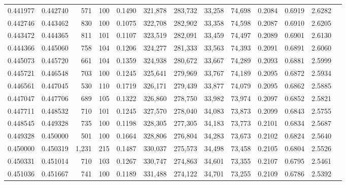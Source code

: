 \begin{tabular}{rrrrrrrrrrrrr}
0.441977 & 0.442740 &    571 &   100 &                                     0.1490 & 321,878 & 283,732 &  33,258 &  74,698 & 0.2084 & 0.6919 & 2.6282 \\
0.442746 & 0.443462 &    830 &   100 &                                     0.1075 & 322,708 & 282,902 &  33,358 &  74,598 & 0.2087 & 0.6910 & 2.6205 \\
0.443472 & 0.444365 &    811 &   101 &                                     0.1107 & 323,519 & 282,091 &  33,459 &  74,497 & 0.2089 & 0.6901 & 2.6130 \\
0.444366 & 0.445060 &    758 &   104 &                                     0.1206 & 324,277 & 281,333 &  33,563 &  74,393 & 0.2091 & 0.6891 & 2.6060 \\
0.445073 & 0.445720 &    661 &   104 &                                     0.1359 & 324,938 & 280,672 &  33,667 &  74,289 & 0.2093 & 0.6881 & 2.5999 \\
0.445721 & 0.446548 &    703 &   100 &                                     0.1245 & 325,641 & 279,969 &  33,767 &  74,189 & 0.2095 & 0.6872 & 2.5934 \\
0.446561 & 0.447045 &    530 &   110 &                                     0.1719 & 326,171 & 279,439 &  33,877 &  74,079 & 0.2095 & 0.6862 & 2.5885 \\
0.447047 & 0.447706 &    689 &   105 &                                     0.1322 & 326,860 & 278,750 &  33,982 &  73,974 & 0.2097 & 0.6852 & 2.5821 \\
0.447711 & 0.448532 &    710 &   101 &                                     0.1245 & 327,570 & 278,040 &  34,083 &  73,873 & 0.2099 & 0.6843 & 2.5755 \\
0.448545 & 0.449328 &    735 &   100 &                                     0.1198 & 328,305 & 277,305 &  34,183 &  73,773 & 0.2101 & 0.6834 & 2.5687 \\
0.449328 & 0.450000 &    501 &   100 &                                     0.1664 & 328,806 & 276,804 &  34,283 &  73,673 & 0.2102 & 0.6824 & 2.5640 \\
0.450000 & 0.450319 &  1,231 &   215 &                                     0.1487 & 330,037 & 275,573 &  34,498 &  73,458 & 0.2105 & 0.6804 & 2.5526 \\
0.450331 & 0.451014 &    710 &   103 &                                     0.1267 & 330,747 & 274,863 &  34,601 &  73,355 & 0.2107 & 0.6795 & 2.5461 \\
0.451036 & 0.451667 &    741 &   100 &                                     0.1189 & 331,488 & 274,122 &  34,701 &  73,255 & 0.2109 & 0.6786 & 2.5392 \\

\end{tabular}
